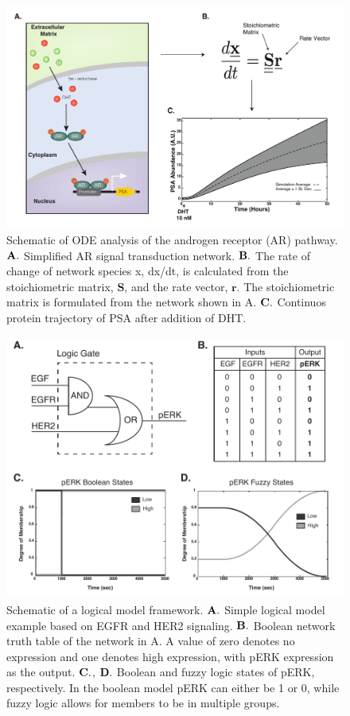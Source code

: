\documentclass[12pt]{article}
\begin{document}


\clearpage

\begin{figure}\centering
\includegraphics[width=1.0\textwidth]{./figs_chap1/Ode_Schematic.pdf}
\caption{Schematic of ODE analysis of the androgen receptor (AR) pathway. $\bf{A.}$ Simplified AR signal transduction network. $\bf{B.}$ The rate of change of network species x, dx/dt, is calculated from the stoichiometric matrix, $\mathbf{S}$, and the rate vector, $\mathbf{r}$. The stoichiometric matrix is formulated from the network shown in A. $\bf{C.}$ Continuos protein trajectory of PSA after addition of DHT.}
\label{fg:ODE_Model}
\end{figure}

\clearpage

\begin{figure}\centering
\includegraphics[width=1.0\textwidth]{./figs_chap1/Logic_Figure.pdf}
\caption{Schematic of a logical model framework. $\bf{A.}$ Simple logical model example based on EGFR and HER2 signaling. $\bf{B.}$ Boolean network truth table of the network in A. A value of zero denotes no expression and one denotes high expression, with pERK expression as the output. $\bf{C.}$, $\bf{D.}$ Boolean and fuzzy logic states of pERK, respectively. In the boolean model pERK can either be 1 or 0, while fuzzy logic allows for members to be in multiple groups.}
\label{fg:Logic_Model}
\end{figure}

\clearpage


\end{document}

